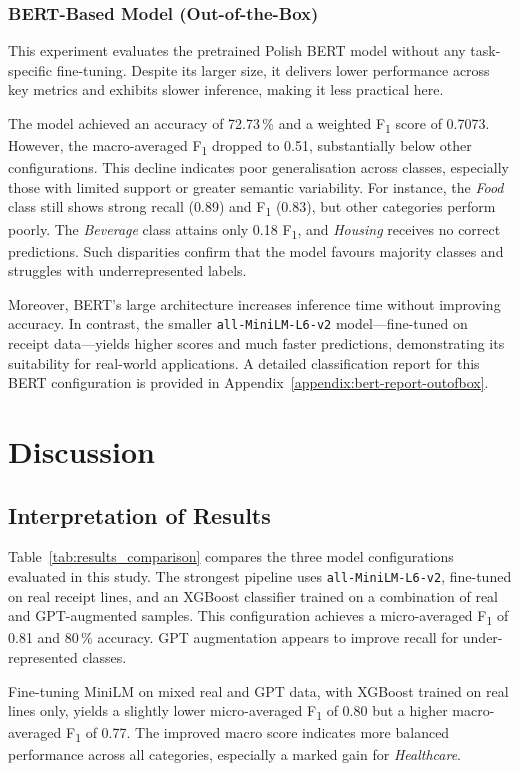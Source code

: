\documentclass{SGGW-thesis-EN}
\begin{document}
\subsection{BERT-Based Model (Out-of-the-Box)}
This experiment evaluates the pretrained Polish BERT model without any task-specific fine-tuning. Despite its larger size, it delivers lower performance across key metrics and exhibits slower inference, making it
less practical here.

The model achieved an accuracy of 72.73\,\% and a weighted F\textsubscript{1} score of 0.7073. However, the
macro-averaged F\textsubscript{1} dropped to 0.51, substantially below other configurations. This decline indicates poor
generalisation across classes, especially those with limited support or greater semantic variability.
For instance, the \emph{Food} class still shows strong recall (0.89) and F\textsubscript{1} (0.83), but other categories
perform poorly. The \emph{Beverage} class attains only 0.18 F\textsubscript{1}, and \emph{Housing} receives no correct
predictions. Such disparities confirm that the model favours majority classes and struggles with underrepresented labels.

Moreover, BERT’s large architecture increases inference time without improving accuracy. In contrast, the smaller
\texttt{all-MiniLM-L6-v2} model—fine-tuned on receipt data—yields higher scores and much faster predictions,
demonstrating its suitability for real-world applications.
A detailed classification report for this BERT configuration is provided in Appendix~\ref{appendix:bert-report-outofbox}.

\chapter{Discussion}

\section{Interpretation of Results}
Table~\ref{tab:results_comparison} compares the three model configurations evaluated in this study. The strongest
pipeline uses \texttt{all-MiniLM-L6-v2}, fine-tuned on real receipt lines, and an XGBoost classifier trained on a
combination of real and GPT-augmented samples. This configuration achieves a micro-averaged F\textsubscript{1} of 0.81
and 80\,\% accuracy. GPT augmentation appears to improve recall for under-represented classes.

Fine-tuning MiniLM on mixed real and GPT data, with XGBoost trained on real lines only, yields a slightly lower
micro-averaged F\textsubscript{1} of 0.80 but a higher macro-averaged F\textsubscript{1} of 0.77. The improved macro
score indicates more balanced performance across all categories, especially a marked gain for \emph{Healthcare}.
\end{document}

